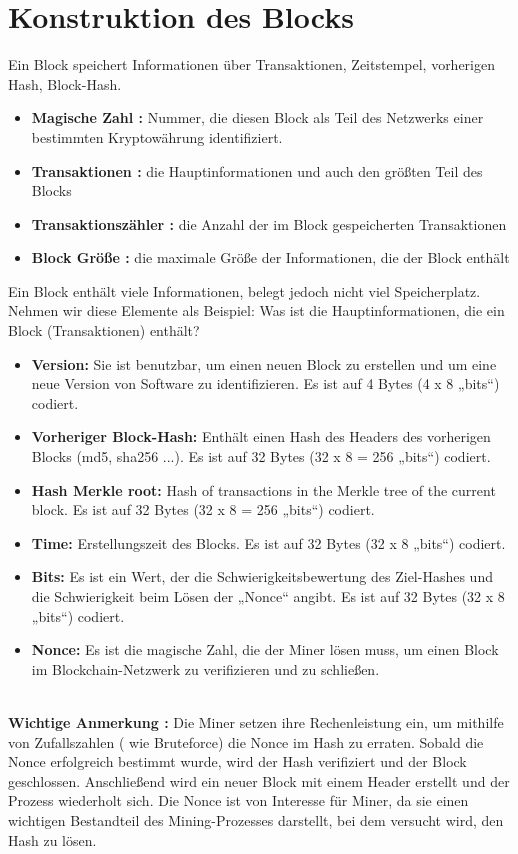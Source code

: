 \section{Konstruktion des Blocks}
Ein Block speichert Informationen über Transaktionen, Zeitstempel, vorherigen Hash, Block-Hash.
\begin{itemize}
	\item \textbf{Magische Zahl :} Nummer, die diesen Block als Teil des Netzwerks einer bestimmten Kryptowährung identifiziert.
	\item \textbf{Transaktionen :} die Hauptinformationen und auch den größten Teil des Blocks
	\item \textbf{Transaktionszähler :} die Anzahl der im Block gespeicherten Transaktionen
	\item \textbf{Block Größe :} die maximale Größe der Informationen, die der Block enthält
\end{itemize} 
Ein Block enthält viele Informationen, belegt jedoch nicht viel Speicherplatz. Nehmen wir diese Elemente als Beispiel:
Was ist die Hauptinformationen, die ein Block (Transaktionen) enthält?
\begin{itemize}
	\item \textbf{Version:} Sie ist benutzbar, um einen neuen Block zu erstellen und um eine neue Version von Software zu identifizieren. Es ist auf 4 Bytes (4 x 8 „bits“) codiert.
	\item \textbf{Vorheriger Block-Hash:} Enthält einen Hash des Headers des vorherigen Blocks (md5, sha256 ...). Es ist auf 32 Bytes (32 x 8 = 256 „bits“) codiert.
	\item \textbf{Hash Merkle root:} Hash of transactions in the Merkle tree of the current block. Es ist auf 32 Bytes (32 x 8 = 256 „bits“) codiert.
	\item \textbf{Time:} Erstellungszeit des Blocks. Es ist auf 32 Bytes (32 x 8 „bits“) codiert.
	\item \textbf{Bits:} Es ist ein Wert, der die Schwierigkeitsbewertung des Ziel-Hashes und die Schwierigkeit beim Lösen der „Nonce“ angibt. Es ist auf 32 Bytes (32 x 8 „bits“) codiert.
	\item \textbf{Nonce:} Es ist die magische Zahl, die der Miner lösen muss, um einen Block im Blockchain-Netzwerk zu verifizieren und zu schließen.\\ \\
\end{itemize}

\textbf{Wichtige Anmerkung :} Die Miner setzen ihre Rechenleistung ein, um mithilfe von Zufallszahlen ( wie Bruteforce) die Nonce im Hash zu erraten. Sobald die Nonce erfolgreich bestimmt wurde, wird der Hash verifiziert und der Block geschlossen. Anschließend wird ein neuer Block mit einem Header erstellt und der Prozess wiederholt sich. Die Nonce ist von Interesse für Miner, da sie einen wichtigen Bestandteil des Mining-Prozesses darstellt, bei dem versucht wird, den Hash zu lösen. \\ \\ \\

